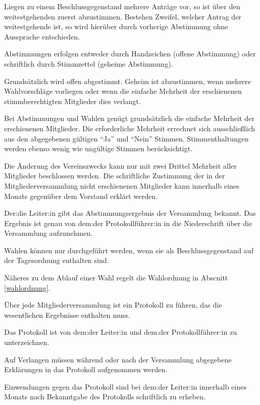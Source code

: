 \begin{gfmitglieder}
  Liegen zu einem Beschlussgegenstand mehrere Anträge vor, so ist über den weitestgehenden zuerst abzustimmen. Bestehen Zweifel, welcher Antrag der weitestgehende ist, so wird hierüber durch vorherige Abstimmung ohne Aussprache entschieden.


  Abstimmungen erfolgen entweder durch Handzeichen (offene Abstimmung) oder schriftlich durch Stimmzettel (geheime Abstimmung).

  Grundsätzlich wird offen abgestimmt. Geheim ist abzustimmen, wenn mehrere Wahlvorschläge vorliegen oder wenn die einfache Mehrheit der erschienenen stimmberechtigten Mitglieder dies verlangt.


  Bei Abstimmungen und Wahlen genügt grundsätzlich die einfache Mehrheit der erschienenen Mitglieder. Die erforderliche Mehrheit errechnet sich ausschließlich aus den abgegebenen gültigen \enquote{Ja} und \enquote{Nein} Stimmen. Stimmenthaltungen werden ebenso wenig wie ungültige Stimmen berücksichtigt.

  Die Änderung des Vereinszwecks kann nur mit zwei Drittel Mehrheit aller Mitglieder beschlossen werden. Die schriftliche Zustimmung der in der Mitgliederversammlung nicht erschienenen Mitglieder kann innerhalb eines Monats gegenüber dem Vorstand erklärt werden.

  Der:die Leiter:in gibt das Abstimmungsergebnis der Versammlung bekannt. Das Ergebnis ist genau von dem:der Protokollführer:in in die Niederschrift über die Versammlung aufzunehmen.


  Wahlen können nur durchgeführt werden, wenn sie als Beschlussgegenstand auf der Tagesordnung enthalten sind.

  Näheres zu dem Ablauf einer Wahl regelt die Wahlordnung in Abscnitt \ref{wahlordnung}.


  Über jede Mitgliederversammlung ist ein Protokoll zu führen, das die wesentlichen Ergebnisse enthalten muss.

  Das Protokoll ist von dem:der Leiter:in und dem:der Protokollführer:in zu unterzeichnen.

  Auf Verlangen müssen während oder nach der Versammlung abgegebene Erklärungen in das Protokoll aufgenommen werden.

  Einwendungen gegen das Protokoll sind bei dem:der Leiter:in innerhalb eines Monats nach Bekanntgabe des Protokolls schriftlich zu erheben.

\end{gfmitglieder}

